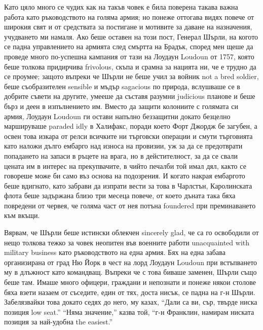 \documentclass[12pt]{book}
\begin{document}
Като цяло много се чудих как на такъв човек е била поверена такава важна работа като ръководството на голяма армия; но понеже оттогава видях повече от широкия свят и от средствата за постигане и мотивите за даване на назначения, учудването ми намаля. Ако беше оставен на този пост, Генерал Шърли, на когото се падна управлението на армията след смъртта на Брадък, според мен щеше да проведе много по-успешна кампания от тази на Лоудаун Loudoun от 1757, която беше толкова придирчива frivolous, скъпа и срамна за нацията ни, че е трудно да се проумее; защото въпреки че Шърли не беше учил за войник not a bred soldier, беше съобразителен sensible и мъдър sagacious по природа, вслушваше се в добрите съвети на другите, умееше да съставя разумни judicious планове и беше бърз и деен в изпълнението им. Вместо да защити колониите с голямата си армия, Лоудаун Loudoun ги остави напълно беззащитни докато безцелно маршируваше paraded idly в Халифакс, поради което Форт Джордж бе загубен, а освен това изкара от релси всичките ни търговски операции и смути търговията като наложи дълго ембарго над износа на провизии, уж за да се предотврати попадането на запаси в ръцете на врага, но в дейстителност, за да се свали цената им в интерес на прекупвачите, в чийто печалби той имал дял, както се говореше може би само въз основа на подозрения. И когато накрая ембаргото беше вдигнато, като забрави да изпрати вести за това в Чарлстън, Каролинската флота беше задържана близо три месеца повече, от което дъната така бяха повредени от червея, че голяма част от нея потъна foundered при преминаването към вкъщи. 

Вярвам, че Шърли беше истински облекчен sincerely glad, че са го освободили от нещо толкова тежко за човек неопитен във военните работи unacquainted with military business като ръководството на една армия. Бях на една забава организирана от град Ню Йорк в чест на лорд Лоудаун Loudoun при встъпването му в длъжност като командващ. Въпреки че с това биваше заменен, Шърли също беше там. Имаше много офицери, граждани и непознати и понеже някои столове бяха взети назаем от съседите, един от тях, доста нисък, се падна на г-н Шърли. Забелязвайки това докато седях до него, му казах, “Дали са ви, сър, твърде ниска позиция low seat.” “Няма значение,” казва той, “г-н Франклин, намирам ниската позиция за най-удобна the easiest.”
\end{document}
